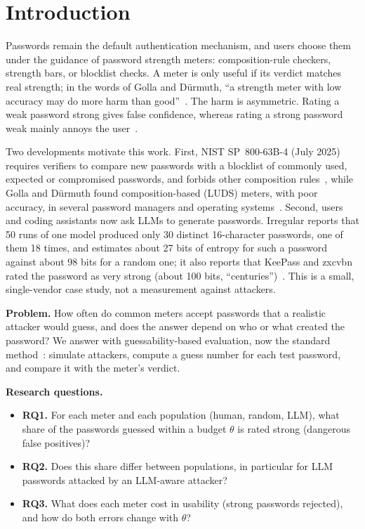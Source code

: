 \documentclass[conference]{IEEEtran}
\begin{document}
\section{Introduction}
Passwords remain the default authentication mechanism, and users choose them under the guidance of password strength meters: composition-rule checkers, strength bars, or blocklist checks. A meter is only useful if its verdict matches real strength; in the words of Golla and D\"urmuth, ``a strength meter with low accuracy may do more harm than good''~\cite{golla2018}. The harm is asymmetric. Rating a weak password strong gives false confidence, whereas rating a strong password weak mainly annoys the user~\cite{wang2023}.

Two developments motivate this work. First, NIST SP~800-63B-4 (July 2025) requires verifiers to compare new passwords with a blocklist of commonly used, expected or compromised passwords, and forbids other composition rules~\cite{nist80063b4}, while Golla and D\"urmuth found composition-based (LUDS) meters, with poor accuracy, in several password managers and operating systems~\cite{golla2018}. Second, users and coding assistants now ask LLMs to generate passwords. Irregular reports that 50 runs of one model produced only 30 distinct 16-character passwords, one of them 18 times, and estimates about 27 bits of entropy for such a password against about 98 bits for a random one; it also reports that KeePass and zxcvbn rated the password as very strong (about 100 bits, ``centuries'')~\cite{irregular2026}. This is a small, single-vendor case study, not a measurement against attackers.

\textbf{Problem.} How often do common meters accept passwords that a realistic attacker would guess, and does the answer depend on who or what created the password? We answer with guessability-based evaluation, now the standard method~\cite{wheeler2016,golla2018,wang2023}: simulate attackers, compute a guess number for each test password, and compare it with the meter's verdict.

\textbf{Research questions.}
\begin{itemize}
\item \textbf{RQ1.} For each meter and each population (human, random, LLM), what share of the passwords guessed within a budget $\theta$ is rated strong (dangerous false positives)?
\item \textbf{RQ2.} Does this share differ between populations, in particular for LLM passwords attacked by an LLM-aware attacker?
\item \textbf{RQ3.} What does each meter cost in usability (strong passwords rejected), and how do both errors change with $\theta$?
\end{itemize}
\end{document}
